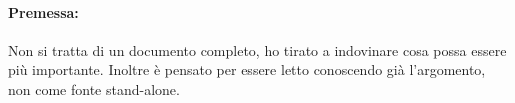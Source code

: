 \documentclass[11pt]{article}
\begin{document}
    
	\maketitle
    
    \paragraph{Premessa:} Non si tratta di un documento completo, ho tirato a indovinare cosa possa essere più importante. Inoltre è pensato per essere letto conoscendo già l'argomento, non come fonte stand-alone.
    
	\tableofcontents
	\newpage	

    

    

    

    
    
    
    
    
    
    
    
    
\end{document}
